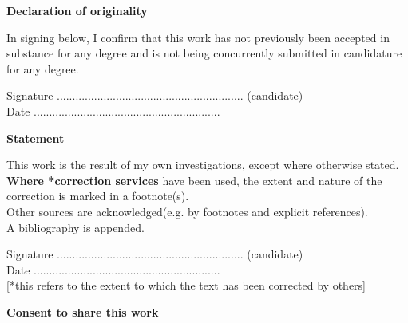 \thispagestyle{empty}

\begin{center}
    {\LARGE\bf Declaration of originality}
\end{center}

In signing below, I confirm that this work has not previously been accepted in substance for any degree and is not being concurrently submitted in candidature for any degree.


\vspace{3em}
Signature ............................................................ (candidate)  \\

\vspace{1em}
Date ............................................................ \\


\begin{center}
	{\LARGE\bf Statement}
\end{center}
This work is the result of my own investigations, except where otherwise stated. \textbf{Where *correction services} have been used, the extent and nature of the correction is marked in a footnote(s).\\
Other sources are acknowledged(e.g. by footnotes and explicit references).\\
A bibliography is appended.


\vspace{3em}
Signature ............................................................ (candidate)  \\

\vspace{1em}
Date ............................................................ \\


[*this refers to the extent to which the text has been corrected by others]

\vspace{5em}
\begin{center}
    {\LARGE\bf Consent to share this work}
\end{center}

